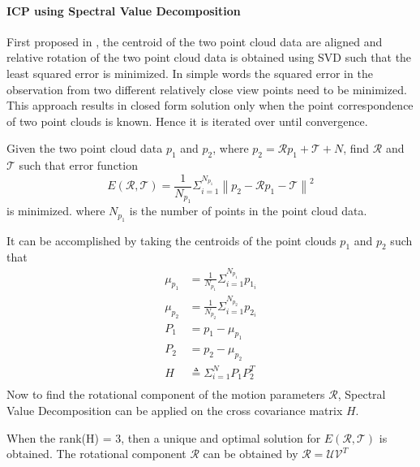 \paragraph{ICP using Spectral Value Decomposition}
First proposed in \cite{KS.Arun}, the centroid of the two point cloud data are aligned and relative rotation of the two point cloud data is obtained using SVD such that the least squared error is minimized.
In simple words the squared error in the observation from two different relatively close view points need to be minimized. 
This approach results in closed form solution only when the point correspondence of two point clouds is known. Hence it is iterated over until convergence.
\par
Given the two point cloud data $p_1$ and $p_2$, where $p_2 = \mathcal{R}p_1 + \mathcal{T} + N$, find $\mathcal{R}$ and $\mathcal{T}$ such that error function
\begin{equation}
    E(\mathcal{R}, \mathcal{T}) = \frac{1}{N_{p_1}}  \Sigma_{i=1}^{N_{p_1}}\left\lVert p_2 - \mathcal{R} p_1 -\mathcal{T} \right\rVert^2 
\end{equation}
is minimized.
where $N_{p_1}$ is the number of points in the point cloud data.

It can be accomplished by taking the centroids of the point clouds $p_1$ and $p_2$ such that
\begin{equation}
    \begin{aligned}
        \mu_{p_1}&= \frac{1}{N_{p_1}} \Sigma_{i=1}^{N_{p_1}} p_{1_i}\\

        \mu_{p_2}&= \frac{1}{N_{p_2}} \Sigma_{i=1}^{N_{p_2}} p_{2_i}\\

        P_1&= p_1 - \mu_{p_1}\\
        P_2&= p_2 - \mu_{p_2}\\

        H&\triangleq  \Sigma_{i=1}^{N} P_1 P_2^T\\
    \end{aligned}
\end{equation}
Now to find the rotational component of the motion parameters $\mathcal{R}$, 
Spectral Value Decomposition can be applied on the cross covariance matrix $H$.

When the rank(H) = 3, then a unique and optimal solution for $E(\mathcal{R}, \mathcal{T})$ is obtained.
The rotational component $\mathcal{R}$ can be obtained by 
$\mathcal{R} = \mathcal{U} \mathcal{V}^T$

